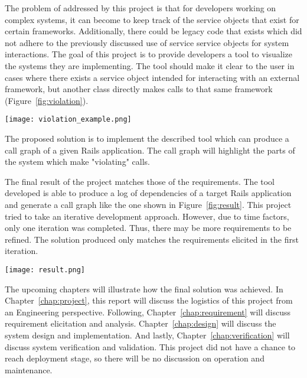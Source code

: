 The problem of addressed by this project is that for developers working on complex systems, it can become to keep track of the service objects that exist for certain frameworks. Additionally, there could be legacy code that exists which did not adhere to the previously discussed use of service service objects for system interactions. The goal of this project is to provide developers a tool to visualize the systems they are implementing. The tool should make it clear to the user in cases where there exists a service object intended for interacting with an external framework, but another class directly makes calls to that same framework (Figure~\ref{fig:violation}).
\begin{center}
    \texttt{[image: violation\_example.png]}
    \label{fig:violation}
\end{center}

The proposed solution is to implement the described tool which can produce a call graph of a given Rails application. The call graph will highlight the parts of the system which make "violating" calls.

The final result of the project matches those of the requirements. The tool developed is able to produce a log of dependencies of a target Rails application and generate a call graph like the one shown in Figure~\ref{fig:result}. This project tried to take an iterative development approach. However, due to time factors, only one iteration was completed. Thus, there may be more requirements to be refined. The solution produced only matches the requirements elicited in the first iteration.
\begin{center}
  \texttt{[image: result.png]}
    \label{fig:result}
\end{center}

The upcoming chapters will illustrate how the final solution was achieved. In Chapter~\ref{chap:project}, this report will discuss the logistics of this project from an Engineering perspective. Following, Chapter~\ref{chap:requirement} will discuss requirement elicitation and analysis. Chapter~\ref{chap:design} will discuss the system design and implementation. And lastly, Chapter~\ref{chap:verification} will discuss system verification and validation. This project did not have a chance to reach deployment stage, so there will be no discussion on operation and maintenance. 
